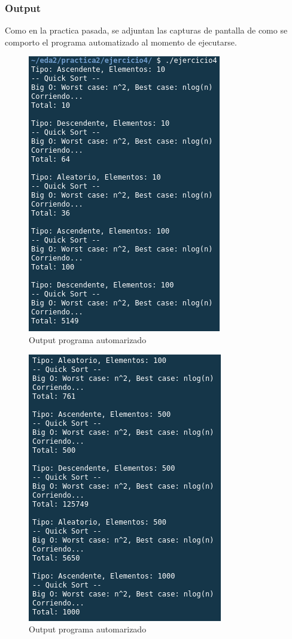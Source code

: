 \documentclass{article}
\begin{document}
		\subsubsection{Output}
		
		Como en la practica pasada, se adjuntan las capturas de pantalla de como se comporto el programa automatizado al momento de ejecutarse.
		
		\begin{figure}[H]
			\centering
			\includegraphics[scale = 1]{images/e41.png}
			\caption{Output programa automarizado}
		\end{figure}
	
		\begin{figure}[H]
			\centering
			\includegraphics[scale = 1]{images/e42.png}
			\caption{Output programa automarizado}
		\end{figure}
	
\end{document}
